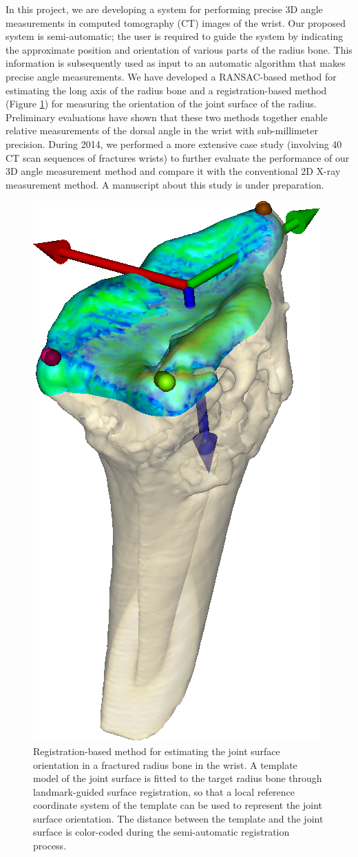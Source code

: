 \documentclass[10pt, a4paper]{article}
\begin{document}
\begin{enumerate}
{In this project, we are developing a system for performing precise 3D angle measurements in computed tomography (CT) images of the wrist. Our proposed system is semi-automatic; the user is required to guide the system by indicating the approximate position and orientation of various parts of the radius bone. This information is subsequently used as input to an automatic algorithm that makes precise angle measurements. We have developed a RANSAC-based method for estimating the long axis of the radius bone and a registration-based method (Figure \ref{fig:wrist}) for measuring the orientation of the joint surface of the radius. Preliminary evaluations have shown that these two methods together enable relative measurements of the dorsal angle in the wrist with sub-millimeter precision. During 2014, we performed a more extensive case study (involving 40 CT scan sequences of fractures wrists) to further evaluate the performance of our 3D angle measurement method and compare it with the conventional 2D X-ray measurement method. A manuscript about this study is under preparation.}

\begin{figure}[!htbp]
\centering
\includegraphics[height=0.9\textwidth, angle=90]{figures/research/wrist_2014.png}
\caption{\label{fig:wrist} Registration-based method for estimating the joint surface orientation in a fractured radius bone in the wrist. A template model of the joint surface is fitted to the target radius bone through landmark-guided surface registration, so that a local reference coordinate system of the template can be used to represent the joint surface orientation. The distance between the template and the joint surface is color-coded during the semi-automatic registration process.}
\end{figure}


\end{enumerate}
\end{document}
